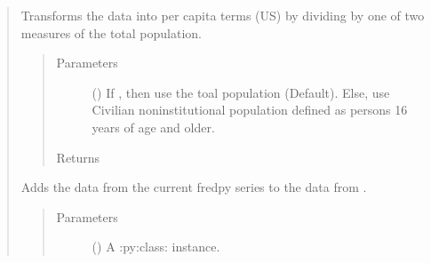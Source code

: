 \documentclass[letterpaper,10pt,openany,oneside,english]{sphinxmanual}
\begin{document}
\begin{fulllineitems}
\begin{quote}
\begin{fulllineitems}
\begin{quote}
\begin{description}
\end{description}\end{quote}

\end{fulllineitems}


\begin{fulllineitems}
\label{\detokenize{series_class:fredpy.series.percapita}}
Transforms the data into per capita terms (US) by dividing by one of two measures of the total population.
\begin{quote}\begin{description}
\item[{Parameters}] \leavevmode
{} () \textendash{} If , then use the toal population (Default). Else, use Civilian noninstitutional population defined as persons 16 years of age and older.

\item[{Returns}] \leavevmode
{\hyperref[\detokenize{series_class:fredpy.series}]{}}

\end{description}\end{quote}

\end{fulllineitems}


\begin{fulllineitems}
\label{\detokenize{series_class:fredpy.series.plus}}
Adds the data from the current fredpy series to the data from .
\begin{quote}\begin{description}
\item[{Parameters}] \leavevmode
{} ({\hyperref[\detokenize{series_class:fredpy.series}]{}}) \textendash{} A :py:class: instance.


\end{description}
\end{quote}
\end{fulllineitems}
\end{quote}
\end{fulllineitems}
\end{document}
